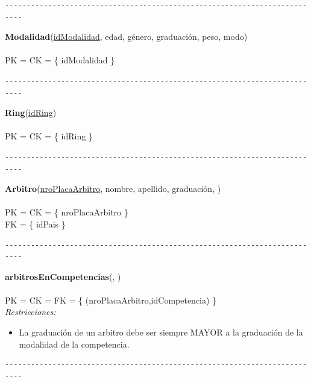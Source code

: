 \begin{verbatim}
--------------------------------------------------------------------------
\end{verbatim}

\noindent\textbf{Modalidad}(\uline{idModalidad}, edad, género, graduación, peso, modo)
\\
\\
PK = CK = \{ idModalidad \} \\

\begin{verbatim}
--------------------------------------------------------------------------
\end{verbatim}

\noindent\textbf{Ring}(\uline{idRing})
\\
\\
PK = CK = \{ idRing \} \\

\begin{verbatim}
--------------------------------------------------------------------------
\end{verbatim}

\noindent\textbf{Arbitro}(\uline{nroPlacaArbitro}, nombre, apellido, graduación, )
\\
\\
PK = CK = \{ nroPlacaArbitro \} \\
FK = \{ idPais \} \\

\begin{verbatim}
--------------------------------------------------------------------------
\end{verbatim}

\noindent\textbf{arbitrosEnCompetencias}(, )
\\
\\
PK = CK = FK = \{ (nroPlacaArbitro,idCompetencia) \} \\

\textit{Restricciones:}
\begin{itemize}
	\item La graduación de un arbitro debe ser siempre MAYOR a la graduación de la modalidad de la competencia.
\end{itemize}

\begin{verbatim}
--------------------------------------------------------------------------
\end{verbatim}

